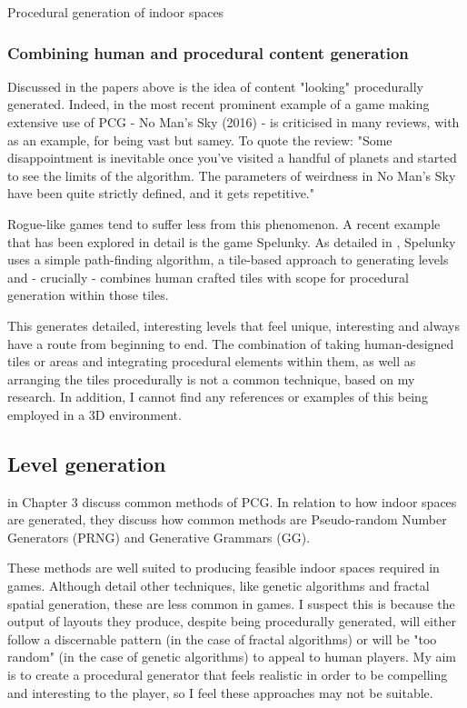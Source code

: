 \documentclass[review]{cmpreport}
\begin{document}
\begin{section}{Procedural generation of indoor spaces}
\subsubsection{Combining human and procedural content generation}
Discussed in the papers above is the idea of content "looking" procedurally generated. Indeed, in the most recent prominent example of a game making extensive use of PCG - No Man's Sky (2016) - is criticised in many reviews, with \cite{welsh_2016} as an example, for being vast but samey. To quote the review: "Some disappointment is inevitable once you've visited a handful of planets and started to see the limits of the algorithm. The parameters of weirdness in No Man's Sky have been quite strictly defined, and it gets repetitive." \par
Rogue-like games tend to suffer less from this phenomenon. A recent example that has been explored in detail is the game Spelunky. As detailed in \cite{gct-spelunky}, Spelunky uses a simple path-finding algorithm, a tile-based approach to generating levels and - crucially - combines human crafted tiles with scope for procedural generation within those tiles. \par
This generates detailed, interesting levels that feel unique, interesting and always have a route from beginning to end. The combination of taking human-designed tiles or areas and integrating procedural elements within them, as well as arranging the tiles procedurally is not a common technique, based on my research. In addition, I cannot find any references or examples of this being employed in a 3D environment.

\section{Level generation}
\cite{Hendrikx:2013:PCG:2422956.2422957} in Chapter 3 discuss common methods of PCG. In relation to how indoor spaces are generated, they discuss how common methods are Pseudo-random Number Generators (PRNG) and Generative Grammars (GG). \par
These methods are well suited to producing feasible indoor spaces required in games. Although \cite{Hendrikx:2013:PCG:2422956.2422957} detail other techniques, like genetic algorithms and fractal spatial generation, these are less common in games. I suspect this is because the output of layouts they produce, despite being procedurally generated, will either follow a discernable pattern (in the case of fractal algorithms) or will be "too random" (in the case of genetic algorithms) to appeal to human players. My aim is to create a procedural generator that feels realistic in order to be compelling and interesting to the player, so I feel these approaches may not be suitable.


\end{section}
\end{document}
